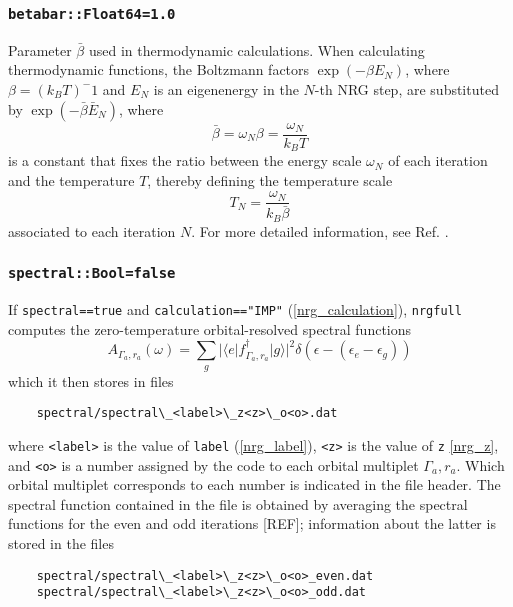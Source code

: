 \documentclass[notitlepage]{article}
\newcommand{\ket}[1]{|#1\rangle}
\newcommand{\bra}[1]{\langle #1 |}
\begin{document}
\subsubsection{\texttt{betabar::Float64=1.0}}
\label{nrg_betabar}
Parameter $\bar\beta$ used in thermodynamic calculations.
When calculating thermodynamic functions, the Boltzmann
factors $\exp(-\beta E_N)$, where $\beta=(k_B T)^-1$ and
$E_N$ is an eigenenergy in the $N$-th NRG step, are
substituted by $\exp(-\bar\beta \bar E _N)$, where
\begin{equation}
    \bar\beta=\omega_N \beta=\frac{\omega_N}{k_B T}
\end{equation}
is a constant that fixes the ratio between the energy scale
$\omega_N$ of each iteration and the temperature $T$,
thereby defining the temperature scale 
\begin{equation}
    T_N = \frac{\omega_N}{k_B \bar\beta}
\end{equation}
associated to each iteration $N$. For more detailed
information, see Ref. \cite{bulla2008}.

\subsubsection{\texttt{spectral::Bool=false}}
\label{nrg_spectral}
If \texttt{spectral==true} and \texttt{calculation=="IMP"}
(\ref{nrg_calculation}), \texttt{nrgfull} computes the
zero-temperature orbital-resolved spectral functions
\begin{equation}
    A_{\Gamma_a,r_a}(\omega) 
    = 
    \sum_g 
    |\bra{e} 
    f^\dagger_{\Gamma_a,r_a}
    \ket{g}|^2
    \delta(\epsilon-(\epsilon_e-\epsilon_g))
\label{eq:spectral_function}
\end{equation}
which it then stores
in files
\begin{verbatim}
    spectral/spectral\_<label>\_z<z>\_o<o>.dat
\end{verbatim}
where \texttt{<label>} is the value of \texttt{label}
(\ref{nrg_label}), \texttt{<z>} is the value of \texttt{z}
\ref{nrg_z}, and \texttt{<o>} is a number assigned by the
code to each orbital multiplet $\Gamma_a,r_a$. Which orbital
multiplet corresponds to each number is indicated in the
file header. The spectral function contained in the file is
obtained by averaging the spectral functions for the even
and odd iterations [REF]; information about the latter is
stored in the files
\begin{verbatim}
    spectral/spectral\_<label>\_z<z>\_o<o>_even.dat
    spectral/spectral\_<label>\_z<z>\_o<o>_odd.dat
\end{verbatim}
\end{document}
